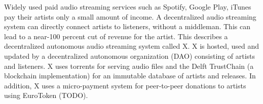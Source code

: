 
Widely used paid audio streaming services such as Spotify, Google Play, iTunes pay their artists only a small amount of income. A decentralized audio streaming system can directly connect artists to listeners, without a middleman. This can lead to a near-100 percent cut of revenue for the artist. This describes a decentralized autonomous audio streaming system called X. X is hosted, used and updated by a decentralized autonomous organization (DAO) consisting of artists and listeners. X uses torrents for serving audio files and the Delft TrustChain (a blockchain implementation) for an immutable database of artists and releases. In addition, X uses a micro-payment system for peer-to-peer donations to artists using EuroToken (TODO).